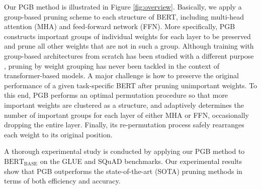 Our PGB method is illustrated in Figure \ref{fig:overview}. Basically, we apply a group-based pruning scheme \cite{DGC,Zhao} to each structure of BERT, including multi-head attention (MHA) and feed-forward network (FFN). More specifically, PGB constructs important groups of individual weights for each layer to be preserved and prune all other weights that are not in such a group. Although training with group-based architectures from scratch has been studied with a different purpose \cite{GroupFormer,groupbert}, pruning by weight grouping has never been tackled in the context of transformer-based models. A major challenge is how to preserve the original performance of a given task-specific BERT after pruning unimportant weights. To this end, PGB performs an optimal permutation procedure so that more important weights are clustered as a structure, and adaptively determines the number of important groups for each layer of either MHA or FFN, occasionally dropping the entire layer. Finally, its re-permutation process safely rearranges each weight to its original position. 

A thorough experimental study is conducted by applying our PGB method to $\text{BERT}_{\text{BASE}}$ \cite{BERT} on the GLUE \cite{GLUE} and SQuAD \cite{SQuAD} benchmarks. Our experimental results show that PGB outperforms the state-of-the-art (SOTA) pruning methods in terms of both efficiency and accuracy.
